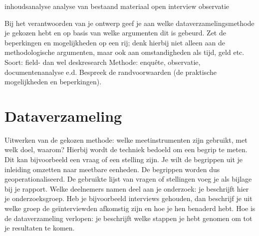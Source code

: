 inhoudsanalyse
analyse van bestaand materiaal
open interview
observatie

Bij het verantwoorden van je ontwerp geef je aan welke dataverzamelingsmethode je gekozen hebt en op basis van welke argumenten dit is gebeurd. Zet de beperkingen en mogelijkheden op een rij; denk hierbij niet alleen aan de methodologische argumenten, maar ook aan omstandigheden als tijd, geld etc.
 Soort: field- dan wel deskresearch
 Methode: enquête, observatie, documentenanalyse e.d.
Bespreek de randvoorwaarden (de praktische mogelijkheden en beperkingen).

\section{Dataverzameling}
 Uitwerken van de gekozen methode: welke meetinstrumenten zijn gebruikt, met welk doel, waarom? Hierbij wordt de techniek bedoeld om een begrip te meten. Dit kan bijvoorbeeld een vraag of een stelling zijn. Je wilt de begrippen uit je inleiding omzetten naar meetbare eenheden. De begrippen worden dus geoperationaliseerd. De gebruikte lijst van vragen of stellingen voeg je als bijlage bij je rapport.
 Welke deelnemers namen deel aan je onderzoek: je beschrijft hier je onderzoeksgroep. Heb je bijvoorbeeld interviews gehouden, dan beschrijf je uit welke groep de geïnterviewden afkomstig zijn en hoe je hen benaderd hebt.
 Hoe is de dataverzameling verlopen: je beschrijft welke stappen je hebt genomen om tot je resultaten te komen.